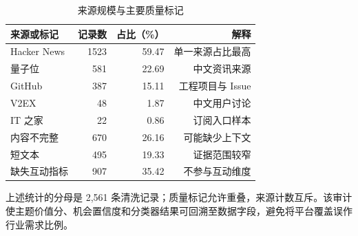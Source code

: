 \begin{table}[H]
  \centering
  \small
  \caption[来源规模与主要质量标记]{来源规模与主要质量标记}
  \label{tab:data-quality-audit}
  \begin{tabular}{lrrr}
    \toprule
    来源或标记 & 记录数 & 占比（\%） & 解释 \\
    \midrule
    Hacker News & 1523 & 59.47 & 单一来源占比最高 \\
    量子位 & 581 & 22.69 & 中文资讯来源 \\
    GitHub & 387 & 15.11 & 工程项目与 Issue \\
    V2EX & 48 & 1.87 & 中文用户讨论 \\
    IT 之家 & 22 & 0.86 & 订阅入口样本 \\
    内容不完整 & 670 & 26.16 & 可能缺少上下文 \\
    短文本 & 495 & 19.33 & 证据范围较窄 \\
    缺失互动指标 & 907 & 35.42 & 不参与互动维度 \\
    \bottomrule
  \end{tabular}
\end{table}

上述统计的分母是 2,561 条清洗记录；质量标记允许重叠，来源计数互斥。该审计使主题价值分、机会置信度和分类器结果可回溯至数据字段，避免将平台覆盖误作行业需求比例。
